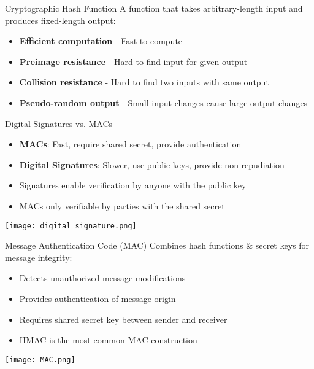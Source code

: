 \begin{minipage}{0.7\linewidth}

    \begin{definition}{Cryptographic Hash Function}
    A function that takes arbitrary-length input and produces fixed-length output:
    \begin{itemize}
        \item \textbf{Efficient computation} - Fast to compute
        \item \textbf{Preimage resistance} - Hard to find input for given output
        \item \textbf{Collision resistance} - Hard to find two inputs with same output
        \item \textbf{Pseudo-random output} - Small input changes cause large output changes
    \end{itemize}
\end{definition}

\begin{concept}{Digital Signatures vs. MACs}
    \begin{itemize}
        \item \textbf{MACs}: Fast, require shared secret, provide authentication
        \item \textbf{Digital Signatures}: Slower, use public keys, provide non-repudiation
        \item Signatures enable verification by anyone with the public key
        \item MACs only verifiable by parties with the shared secret
    \end{itemize}
\end{concept}
\end{minipage}
\begin{minipage}{0.3\linewidth}
    \texttt{[image: digital\_signature.png]}
\end{minipage}



\begin{definition}{Message Authentication Code (MAC)}
    Combines hash functions \& secret keys for message integrity:
    \begin{itemize}
        \item Detects unauthorized message modifications
        \item Provides authentication of message origin
        \item Requires shared secret key between sender and receiver
        \item HMAC is the most common MAC construction
    \end{itemize}
    \texttt{[image: MAC.png]}
\end{definition}

